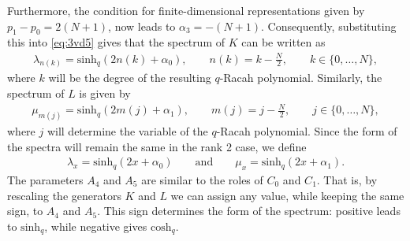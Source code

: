 \documentclass[pdftex]{sigma}
\numberwithin{equation}{section}
\newcommand{\chq}{\mathrm{cosh}_q}
\newcommand{\shq}{\mathrm{sinh}_q}
\begin{document}
Furthermore, the condition for finite-dimensional representations given by $p_1-p_0=2(N+1)$, now leads to $\alpha_3=-(N+1)$.
Consequently, substituting this into \eqref{eq:3vd5} gives that the spectrum of $K$ can be written as
\begin{gather}
	\lambda_{n(k)} = \shq(2n(k)+\alpha_0),\qquad n(k)=k-\frac{N}{2},\qquad k\in\{0,\dots,N\},\label{eq:nieuwspectrumK}
\end{gather}
where $k$ will be the degree of the resulting $q$-Racah polynomial. Similarly, the spectrum of $L$ is given by
\begin{gather}
	\mu_{m(j)} = \shq(2m(j)+\alpha_1),\qquad m(j)=j-\frac{N}{2},\qquad j\in\{0,\dots,N\},\label{eq:nieuwspectrumL}
\end{gather}
where $j$ will determine the variable of the $q$-Racah polynomial.
Since the form of the spectra will remain the same in the rank 2 case, we define
\begin{gather}
\lambda_x=\shq(2x+\alpha_0)\qquad\text{and}\qquad \mu_x=\shq(2x+\alpha_1).\label{eq:eigenvalues}
\end{gather}
The parameters $A_4$ and $A_5$ are similar to the roles of $C_0$ and $C_1$. That is, by rescaling the generators $K$ and $L$ we can assign any value, while keeping the same sign, to $A_4$ and $A_5$. This sign determines the form of the spectrum: positive leads to $\shq$, while negative gives $\chq$.
\end{document}
